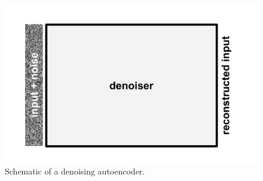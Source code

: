 \begin{figure}
  \includegraphics[width=\linewidth]{img/denoiser}
  \caption{Schematic of a denoising autoencoder.}
  \label{fig:denoiser}
\end{figure}
